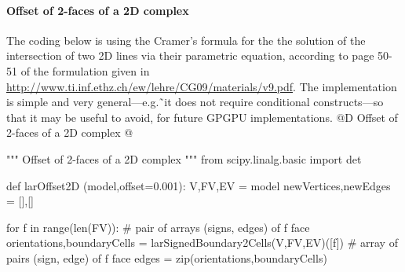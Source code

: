 \documentclass[11pt,oneside]{article}    %
\begin{document}
\paragraph{Offset of 2-faces of a 2D complex}
The coding below is using the Cramer's formula for the the solution of the intersection of two 2D lines via their parametric equation, according to page 50-51 of the formulation given in \href{http://www.ti.inf.ethz.ch/ew/lehre/CG09/materials/v9.pdf}{http://www.ti.inf.ethz.ch/ew/lehre/CG09/materials/v9.pdf}.
The implementation is  simple and very general---e.g.˜it does not require conditional constructs---so that it may be useful to avoid, for future GPGPU implementations.
@D Offset of 2-faces of a 2D complex
@{""" Offset of 2-faces of a 2D complex """
from scipy.linalg.basic import det

def larOffset2D (model,offset=0.001):
    V,FV,EV = model
    newVertices,newEdges = [],[]

    for f in range(len(FV)):
        # pair of arrays (signs, edges) of f face
        orientations,boundaryCells = larSignedBoundary2Cells(V,FV,EV)([f])
        # array of pairs (sign, edge) of f face
        edges = zip(orientations,boundaryCells)
        
}
\end{document}
